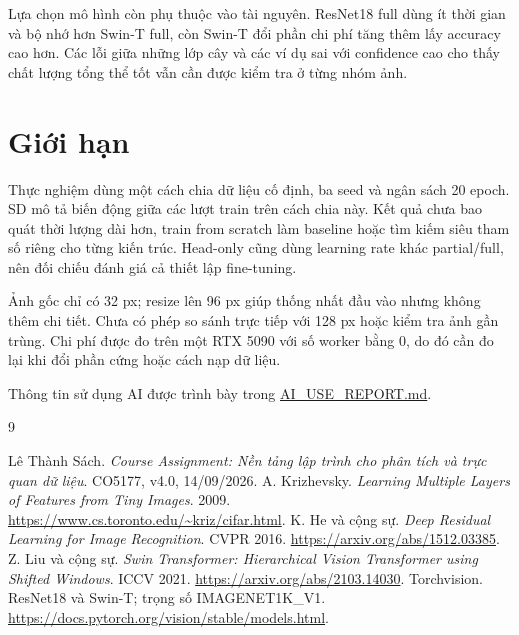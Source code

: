 \documentclass[12pt,a4paper]{report}
\begin{document}
Lựa chọn mô hình còn phụ thuộc vào tài nguyên. ResNet18 full dùng ít thời gian và bộ nhớ hơn Swin-T full, còn Swin-T đổi phần chi phí tăng thêm lấy accuracy cao hơn. Các lỗi giữa những lớp cây và các ví dụ sai với confidence cao cho thấy chất lượng tổng thể tốt vẫn cần được kiểm tra ở từng nhóm ảnh.

\section{Giới hạn}
Thực nghiệm dùng một cách chia dữ liệu cố định, ba seed và ngân sách 20 epoch. SD mô tả biến động giữa các lượt train trên cách chia này. Kết quả chưa bao quát thời lượng dài hơn, train from scratch làm baseline hoặc tìm kiếm siêu tham số riêng cho từng kiến trúc. Head-only cũng dùng learning rate khác partial/full, nên đối chiếu đánh giá cả thiết lập fine-tuning.

Ảnh gốc chỉ có 32 px; resize lên 96 px giúp thống nhất đầu vào nhưng không thêm chi tiết. Chưa có phép so sánh trực tiếp với 128 px hoặc kiểm tra ảnh gần trùng. Chi phí được đo trên một RTX 5090 với số worker bằng 0, do đó cần đo lại khi đổi phần cứng hoặc cách nạp dữ liệu.

Thông tin sử dụng AI được trình bày trong \href{https://github.com/dathuynh1108/CO5177-PFDAV/blob/main/AI_USE_REPORT.md}{AI\_USE\_REPORT.md}.

\begin{thebibliography}{9}
 Lê Thành Sách. \emph{Course Assignment: Nền tảng lập trình cho phân tích và trực quan dữ liệu}. CO5177, v4.0, 14/09/2026.
 A. Krizhevsky. \emph{Learning Multiple Layers of Features from Tiny Images}. 2009. \url{https://www.cs.toronto.edu/~kriz/cifar.html}.
 K. He và cộng sự. \emph{Deep Residual Learning for Image Recognition}. CVPR 2016. \url{https://arxiv.org/abs/1512.03385}.
 Z. Liu và cộng sự. \emph{Swin Transformer: Hierarchical Vision Transformer using Shifted Windows}. ICCV 2021. \url{https://arxiv.org/abs/2103.14030}.
 Torchvision. ResNet18 và Swin-T; trọng số IMAGENET1K\_V1. \url{https://docs.pytorch.org/vision/stable/models.html}.
\end{thebibliography}
\end{document}
